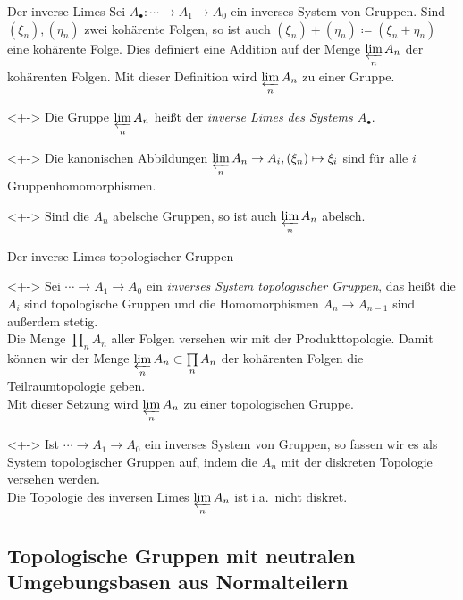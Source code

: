 \begin{frame}{Der inverse Limes}
	Sei \(A_\bullet\colon \dotsb \to A_1 \to A_0\) ein inverses System von Gruppen. Sind \((\xi_n), (\eta_n)\)
	zwei kohärente Folgen, so ist auch \((\xi_n) + (\eta_n) \coloneqq (\xi_n + \eta_n)\) eine
	kohärente Folge. Dies definiert eine Addition auf der Menge \(\varprojlim\limits_n A_n\)
	der kohärenten Folgen. Mit dieser Definition wird \(\varprojlim\limits_n A_n\) zu
	einer Gruppe.
	\begin{definition}<+->
		Die Gruppe \(\varprojlim\limits_n A_n\) heißt der \emph{inverse Limes des Systems
		\(A_\bullet\)}.
	\end{definition}
	\begin{visibleenv}<+->
		Die kanonischen Abbildungen \(\varprojlim\limits_n A_n \to A_i, (\xi_n) \mapsto \xi_i\) sind
		für alle \(i\) Gruppenhomomorphismen.
	\end{visibleenv}
	\begin{remark}<+->
		Sind die \(A_n\) abelsche Gruppen, so ist auch \(\varprojlim\limits_n A_n\) abelsch.
	\end{remark}
\end{frame}

\begin{frame}{Der inverse Limes topologischer Gruppen}
	\begin{remark}<+->
		Sei \(\dotsb \to A_1 \to A_0\) ein \emph{inverses System topologischer Gruppen}, das heißt
		die \(A_i\) sind topologische Gruppen und die Homomorphismen \(A_n \to A_{n - 1}\) sind
		außerdem stetig.
		\\
		Die Menge \(\prod\limits_n A_n\) aller Folgen versehen wir mit der Produkttopologie.
		Damit können wir der Menge \(\varprojlim\limits_n A_n \subset \prod\limits_n A_n\) der kohärenten
		Folgen die Teilraumtopologie geben.
		\\
		Mit dieser Setzung wird \(\varprojlim\limits_n A_n\) zu einer topologischen Gruppe.
	\end{remark}
	\begin{example}<+->
		Ist \(\dotsb \to A_1 \to A_0\) ein inverses System von Gruppen, so fassen wir es
		als System topologischer Gruppen auf, indem die \(A_n\) mit der diskreten Topologie versehen werden.
		\\
		Die Topologie des inversen Limes \(\varprojlim\limits_n A_n\) ist i.a.\ nicht diskret.
	\end{example}
\end{frame}

\subsection{Topologische Gruppen mit neutralen Umgebungsbasen aus Normalteilern}

